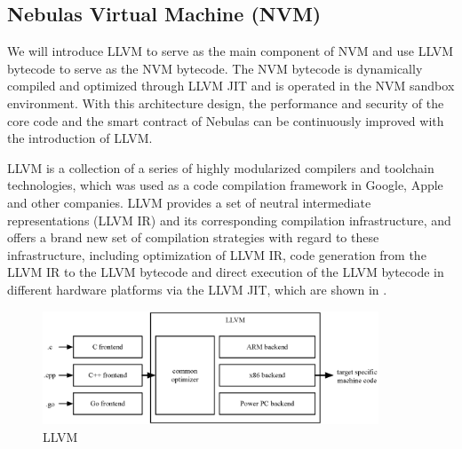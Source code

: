 \subsection{Nebulas Virtual Machine (NVM)}
\label{sec:nvm}

We will introduce LLVM \cite{llvm} to serve as the main component of NVM and use LLVM bytecode to serve as the NVM bytecode. The NVM bytecode is dynamically compiled and optimized through LLVM JIT and is operated in the NVM sandbox environment. With this architecture design, the performance and security of the core code and the smart contract of Nebulas can be continuously improved with the introduction of LLVM. 


LLVM is a collection of a series of highly modularized compilers and toolchain technologies, which was used as a code compilation framework in Google, Apple and other companies. LLVM provides a set of neutral intermediate representations (LLVM IR) and its corresponding compilation infrastructure, and offers a brand new set of compilation strategies with regard to these infrastructure, including optimization of LLVM IR, code generation from the LLVM IR to the LLVM bytecode and direct execution of the LLVM bytecode in different hardware platforms via the LLVM JIT, which are shown in . \\


\begin{figure}[h]
\centering
\includegraphics[width=10cm]{./figs/llvm}
\caption{LLVM}
\label{fig:llvm}
\end{figure}

